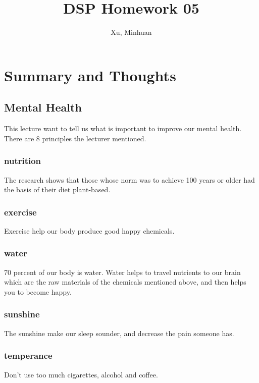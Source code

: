 \documentclass{article}
\begin{document}
\title{DSP Homework 05}
\author{Xu, Minhuan}
\maketitle
\tableofcontents
\begin{abstract}

\end{abstract}

\section{Summary and Thoughts}

\subsection{Mental Health}
This lecture want to tell us what is important to improve our mental health. There are 8 principles the lecturer mentioned.
\subsubsection*{nutrition}
The research shows that those whose norm was to achieve 100 years or older had the basis of their diet plant-based.
\subsubsection*{exercise}
Exercise help our body produce good happy chemicals.

\subsubsection*{water}

70 percent of our body is water. Water helps to travel nutrients to our brain which are the raw materials of the chemicals mentioned above, and then helps you to become happy.

\subsubsection*{sunshine}

The sunshine make our sleep sounder, and decrease the pain someone has.

\subsubsection*{temperance}

Don't use too much cigarettes, alcohol and coffee.
\end{document}
